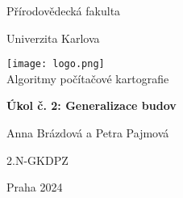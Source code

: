 \documentclass[15pt]{article}
\begin{document}
 

\begin{titlepage}
        \centering
        {\large Přírodovědecká fakulta\par}
        {\large Univerzita Karlova\par}
        \vspace{1.5cm}
        \texttt{[image: logo.png]}\\
        \vspace{1.5cm}
        {\large Algoritmy počítačové kartografie}\\
        \vspace{0.2cm}
        {\large\textbf{Úkol č. 2: Generalizace budov}\par}
        \vspace{1.5cm}
        {\large Anna Brázdová a Petra Pajmová \par}
        \vspace{1.5cm}
        {\large 2.N-GKDPZ \par}
        {\large Praha 2024 \par}
        \vspace{1cm}
\end{titlepage}
\end{document}
